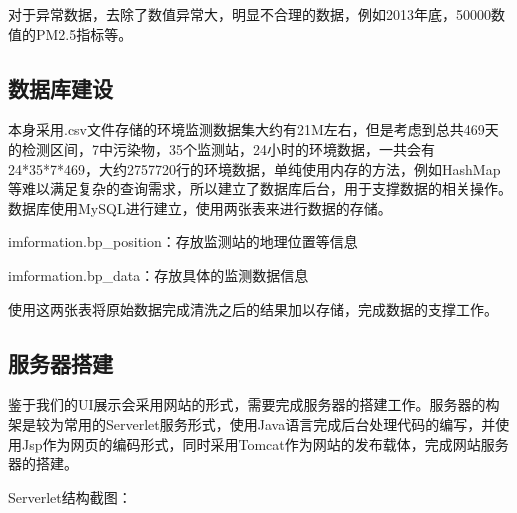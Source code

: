 ﻿\documentclass{article}
\begin{document}
\begin{CJK*}{GBK}{song}
对于异常数据，去除了数值异常大，明显不合理的数据，例如2013年底，50000数值的PM2.5指标等。


\subsection{数据库建设}

\qquad 本身采用.csv文件存储的环境监测数据集大约有21M左右，但是考虑到总共469天的检测区间，7中污染物，35个监测站，24小时的环境数据，一共会有24*35*7*469，大约2757720行的环境数据，单纯使用内存的方法，例如HashMap等难以满足复杂的查询需求，所以建立了数据库后台，用于支撑数据的相关操作。数据库使用MySQL进行建立，使用两张表来进行数据的存储。

imformation.bp\_position：存放监测站的地理位置等信息

\begin{figure}[ht]
\centering
{}
\end{figure}

imformation.bp\_data：存放具体的监测数据信息

\begin{figure}[ht]
\centering
{}
\end{figure}

使用这两张表将原始数据完成清洗之后的结果加以存储，完成数据的支撑工作。


\subsection{服务器搭建}

\qquad 鉴于我们的UI展示会采用网站的形式，需要完成服务器的搭建工作。服务器的构架是较为常用的Serverlet服务形式，使用Java语言完成后台处理代码的编写，并使用Jsp作为网页的编码形式，同时采用Tomcat作为网站的发布载体，完成网站服务器的搭建。

Serverlet结构截图：

\begin{figure}[ht]
\centering
{}
\end{figure}


\end{CJK*}
\end{document}
